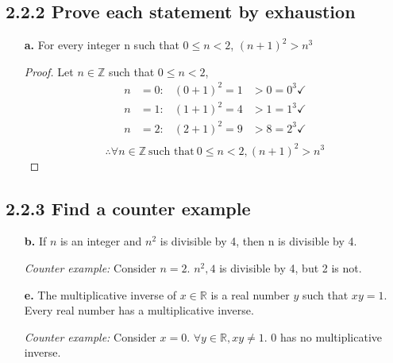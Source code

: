 \documentclass{article}
\newcommand{\bld}{\textbf}
\newcommand{\itl}{\textit}
\begin{document}
\subsection*{2.2.2 Prove each statement by exhaustion}
\begin{enumerate}
  \item[\bld{a.}] For every integer n such that $0 \leq n < 2$, $(n+1)^2 > n^3$
    \begin{proof}
      Let $n \in \mathbb{Z}$ such that $0 \leq n < 2$,
      \begin{align*}
        n & = 0: & (0+1)^2 = 1 & > 0 = 0^3 \checkmark \\
        n & = 1: & (1+1)^2 = 4 & > 1 = 1^3 \checkmark \\
        n & = 2: & (2+1)^2 = 9 & > 8 = 2^3 \checkmark \\
      \end{align*}
      \[
        \therefore \forall n \in \mathbb{Z}~\text{such that}~0 \leq n < 2, (n+1)^2 > n^3
      \]
    \end{proof}
\end{enumerate}

\subsection*{2.2.3 Find a counter example}
\begin{enumerate}
  \item[\bld{b.}] If $n$ is an integer and $n^2$ is divisible by 4, then n is divisible by 4.
  \item[] \itl{Counter example:} Consider $n=2$. $n^2,4$ is divisible by 4, but 2 is not.
  \item[\bld{e.}] The multiplicative inverse of $x \in \mathbb{R}$ is a real number $y$ such that
    $xy = 1$. Every real number has a multiplicative inverse.
  \item[] \itl{Counter example:} Consider $x=0$. $\forall y \in \mathbb{R}, xy \not = 1$. 0 has no multiplicative inverse.
\end{enumerate}
\end{document}
